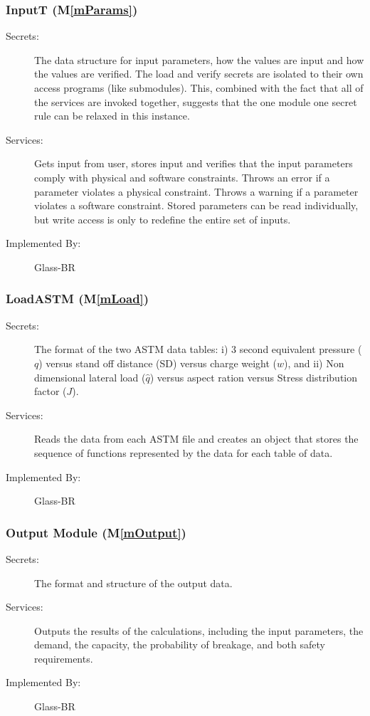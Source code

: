 \documentclass[12pt]{article}
\newcommand{\mref}[1]{M\ref{#1}}
\begin{document}
\subsubsection{InputT (\mref{mParams})}

\begin{description}
\item[Secrets:] The data structure for input parameters, how the
values are input and how the values are verified.  The load and verify secrets
are isolated to their own access programs (like submodules).  This, combined
with the fact that all of the services are invoked together, suggests that the
one module one secret rule can be relaxed in this instance.
\item[Services:] Gets input from user, stores input and verifies that the
  input parameters comply with physical and software constraints. Throws an
  error if a parameter violates a physical constraint. Throws a warning if a
  parameter violates a software constraint.  Stored parameters can be read
  individually, but write access is only to redefine the entire set of inputs.
\item[Implemented By:] Glass-BR
\end{description}

\subsubsection{LoadASTM (\mref{mLoad})}

\begin{description}
\item[Secrets:] The format of the two ASTM data tables: i) 3 second equivalent
  pressure ($q$) versus stand off distance (SD) versus charge weight ($w$), and
  ii) Non dimensional lateral load ($\hat q$) versus aspect ration versus Stress
  distribution factor ($J$).
\item[Services:] Reads the data from each ASTM file and creates an object that
  stores the sequence of functions represented by the data for each table of
  data.
\item[Implemented By:] Glass-BR
\end{description}

\subsubsection{Output Module (\mref{mOutput})}

\begin{description}
\item[Secrets:] The format and structure of the output data.
\item[Services:] Outputs the results of the calculations, including the input
  parameters, the demand, the capacity, the probability of breakage, and both 
  safety requirements.
\item[Implemented By:] Glass-BR
\end{description} 
\end{document}

